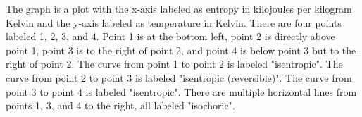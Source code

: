 The graph is a plot with the x-axis labeled as entropy in kilojoules per kilogram Kelvin and the y-axis labeled as temperature in Kelvin. There are four points labeled 1, 2, 3, and 4. Point 1 is at the bottom left, point 2 is directly above point 1, point 3 is to the right of point 2, and point 4 is below point 3 but to the right of point 2. The curve from point 1 to point 2 is labeled "isentropic". The curve from point 2 to point 3 is labeled "isentropic (reversible)". The curve from point 3 to point 4 is labeled "isentropic". There are multiple horizontal lines from points 1, 3, and 4 to the right, all labeled "isochoric".
